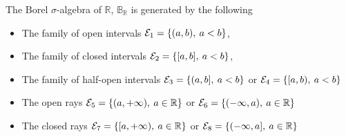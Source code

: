 \documentclass[../../main.tex]{subfiles}
\begin{document}
\providecommand{\borel}{\mathbb{B}_{\mathbb{R}}}
\providecommand{\gen}[1]{\mathcal{M}({\mathcal{E}}_{#1})}
\begin{wts}
    The Borel $\sigma$-algebra of $\mathbb{R}$, $\borel$ is generated by the following
    \begin{itemize}
        \item The family of open intervals ${\cal{E}}_1=\{(a,b),\:a<b\}$,
        \item The family of closed intervals ${\cal{E}}_2=\{[a,b],\:a<b\}$,
        \item The family of half-open intervals ${\cal{E}}_3=\{(a,b],\:a<b\}$ or ${\cal{E}}_4=\{[a,b),\:a<b\}$
        \item The open rays ${\cal{E}}_5=\{(a,+\infty),\:a\in\mathbb{R}\}$ or ${\cal{E}}_6=\{(-\infty,a),\:a\in\mathbb{R}\}$
        \item The closed rays
        ${\cal{E}}_7=\{[a,+\infty),\:a\in\mathbb{R}\}$ or
        ${\cal{E}}_8=\{(-\infty,a],\:a\in\mathbb{R}\}$
    \end{itemize}
\end{wts}
\end{document}
